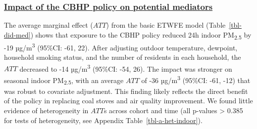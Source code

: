 \documentclass[
  letterpaper,
  DIV=11,
  numbers=noendperiod]{scrartcl}
\providecommand{\DIFadd}[1]{{\protect\color{blue}\underline{#1}}} %
\providecommand{\DIFaddbegin}{} %
\providecommand{\DIFaddend}{} %
\providecommand{\DIFdelbegin}{} %
\providecommand{\DIFdelend}{} %
\newcommand{\DIFscaledelfig}{0.5}
\newlength{\DIFdelgraphicswidth} %
\newlength{\DIFdelgraphicsheight} %
\newcommand{\DIFaddincludegraphics}[2][]{{\color{blue}\fbox{\DIFOincludegraphics[#1]{#2}}}} %
\newcommand{\DIFdelincludegraphics}[2][]{%
\sbox{\DIFdelgraphicsbox}{\DIFOincludegraphics[#1]{#2}}%
\settoboxwidth{\DIFdelgraphicswidth}{\DIFdelgraphicsbox} %
\settoboxtotalheight{\DIFdelgraphicsheight}{\DIFdelgraphicsbox} %
\scalebox{\DIFscaledelfig}{%
\parbox[b]{\DIFdelgraphicswidth}{\usebox{\DIFdelgraphicsbox}\\[-\baselineskip] \rule{\DIFdelgraphicswidth}{0em}}\llap{\resizebox{\DIFdelgraphicswidth}{\DIFdelgraphicsheight}{%
\setlength{\unitlength}{\DIFdelgraphicswidth}%
\begin{picture}(1,1)%
\thicklines\linethickness{2pt} %
{\color[rgb]{1,0,0}\put(0,0){\framebox(1,1){}}}%
{\color[rgb]{1,0,0}\put(0,0){\line( 1,1){1}}}%
{\color[rgb]{1,0,0}\put(0,1){\line(1,-1){1}}}%
\end{picture}%
}\hspace*{3pt}}} %
} %
\DeclareRobustCommand{\DIFaddbegin}{\DIFOaddbegin \let\includegraphics\DIFaddincludegraphics} %
\DeclareRobustCommand{\DIFaddend}{\DIFOaddend \let\includegraphics\DIFOincludegraphics} %
\DeclareRobustCommand{\DIFdelbegin}{\DIFOdelbegin \let\includegraphics\DIFdelincludegraphics} %
\DeclareRobustCommand{\DIFdelend}{\DIFOaddend \let\includegraphics\DIFOincludegraphics} %
\begin{document}
\DIFdelbegin %
\DIFdelend \DIFaddbegin \subsubsection{\DIFadd{Impact of the CBHP policy on potential
mediators}}\label{impact-of-the-cbhp-policy-on-potential-mediators}
\DIFaddend 

The average marginal effect (\(ATT\)) from the basic ETWFE model
(Table~\ref{tbl-did-med}) shows that exposure to the CBHP policy reduced
24h indoor PM\textsubscript{2.5} by -19 µg/m\textsuperscript{3} (95\%CI:
-61, 22). After adjusting outdoor temperature, dewpoint, household
smoking status, and the number of residents in each household, the
\(ATT\) decreased to -14 µg/m\textsuperscript{3} (95\%CI: -54, 26). The
impact was stronger on seasonal indoor PM\textsubscript{2.5}, with an
average \(ATT\) of -36 µg/m\textsuperscript{3} (95\%CI: -61, -12) that
was robust to covariate adjustment. This finding likely reflects the
direct benefit of the policy in replacing coal stoves and air quality
improvement. We found little evidence of heterogeneity in \(ATT\)s
across cohort and time (all p-values \textgreater{} 0.385 for tests of
heterogeneity, see Appendix Table~\ref{tbl-a-het-indoor}).
\end{document}
